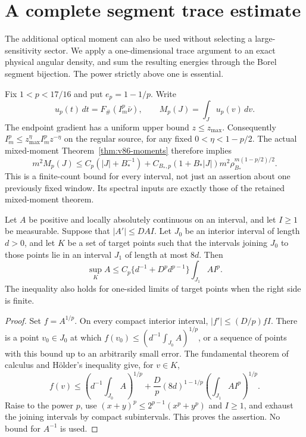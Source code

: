 \section{A complete segment trace estimate}
\label{sec:v87-trace}
The additional optical moment can also be used without selecting a
large-sensitivity sector. We apply a one-dimensional trace argument to
an exact physical angular density, and sum the resulting energies through
the Borel segment bijection. The power strictly above one is essential.

Fix $1<p<17/16$ and put $e_p=1-1/p$. Write
\[
 u_p(t)\,dt=F_\#(I_m^p\bar\nu),\qquad
 M_p(J)=\int_Ju_p(v)\,dv.
\]
The endpoint gradient has a uniform upper bound $z\le z_{\max}$.
Consequently $I_m^p\le z_{\max}^{\eta}I_m^pz^{-\eta}$ on the
regular source, for any fixed $0<\eta<1-p/2$. The actual mixed-moment
Theorem~\ref{thm:v86-moments} therefore implies
\begin{equation}\label{eq:v87-moment}
 m^2M_p(J)\le C_p(|J|+B_*^{-1})
  +C_{B_*,p}(1+B_*|J|)m^2\rho_{B_*}^{m(1-p/2)/2}.
\end{equation}
This is a finite-count bound for every interval, not just an assertion
about one previously fixed window. Its spectral inputs are exactly those
of the retained mixed-moment theorem.

\begin{lemma}
\label{lem:v87-positive-trace}
Let $A$ be positive and locally absolutely continuous on an interval,
and let $I\ge1$ be measurable. Suppose that $|A'|\le DAI$.
Let $J_0$ be an interior interval of length $d>0$, and let $K$ be a
set of target points such that the intervals joining $J_0$ to those
points lie in an interval $J_1$ of length at most $8d$. Then
\begin{equation}\label{eq:v87-positive-trace}
 \sup_K A\le C_p\{d^{-1}+D^pd^{p-1}\}\int_{J_1}AI^p.
\end{equation}
The inequality also holds for one-sided limits of target points when
the right side is finite.
\end{lemma}
\begin{proof}
Set $f=A^{1/p}$. On every compact interior interval,
$|f'|\le (D/p)fI$. There is a point $v_0\in J_0$ at which
$f(v_0)\le(d^{-1}\int_{J_0}A)^{1/p}$, or a sequence of points with
this bound up to an arbitrarily small error. The fundamental theorem
of calculus and H\"older's inequality give, for $v\in K$,
\[
 f(v)\le \left(d^{-1}\int_{J_0}A\right)^{1/p}
       +\frac Dp(8d)^{1-1/p}\left(\int_{J_1}AI^p\right)^{1/p}.
\]
Raise to the power $p$, use $(x+y)^p\le2^{p-1}(x^p+y^p)$ and
$I\ge1$, and exhaust the joining intervals by compact subintervals.
This proves the assertion. No bound for $A^{-1}$ is used.
\end{proof}

